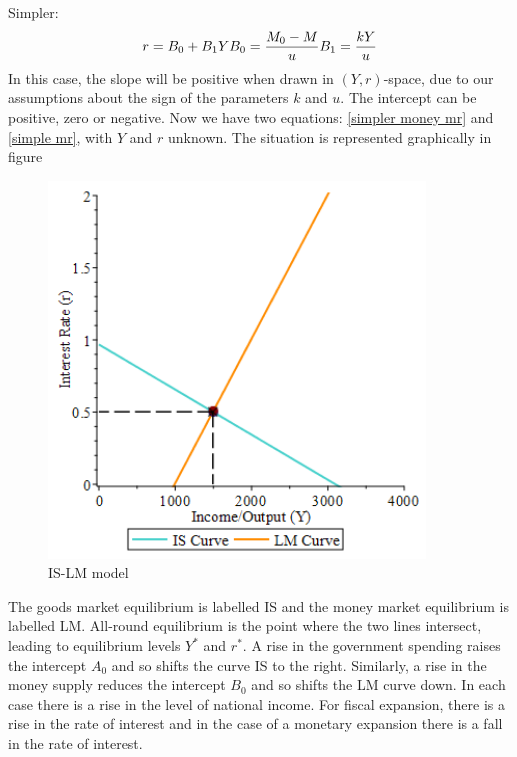 \documentclass[a4paper,11pt]{report}
\begin{document}
Simpler:
\begin{equation}\label{simpler money mr}
 r=B_{0}+B_{1}Y\\
 B_{0}=\frac{M_{0}-M}{u} \\
 B_{1}=\frac{kY}{u}
\end{equation}
In this case, the slope will be positive when drawn in $(Y,r)$-space, due to our assumptions about the sign of the parameters $k$ and $u$. The intercept can be positive, zero or negative.
Now we have two equations: \eqref{simpler money mr} and \eqref{simple mr}, with $Y$ and $r$ unknown. The situation is represented graphically in figure
\begin{figure}[h]
\caption{IS-LM model}
\centering
 \includegraphics[width=10cm]{IS-LM.png}
\end{figure}
The goods market equilibrium is labelled IS and the money market equilibrium is labelled LM. All-round equilibrium is the point where the two lines intersect, leading to equilibrium levels $Y^{*}$ and $r^{*}$. 
A rise in the government spending raises the intercept $A_{0}$ and so shifts the curve IS to the right. Similarly, a rise in the money supply reduces the intercept $B_{0}$ and so shifts the LM curve down. In each case there is a rise in the level of national income. For fiscal expansion, there is a rise in the rate of interest and in the case of a monetary expansion there is a fall in the rate of interest.
\end{document}
